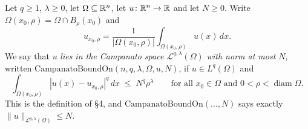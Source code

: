 \begin{definition}
Let $q\ge1$, $\lambda\ge0$, let $\Omega\subseteq\mathbb{R}^n$, let $u\colon\mathbb{R}^n\to\mathbb{R}$
and let $N\ge0$.  Write $\Omega(x_0,\rho)=\Omega\cap B_\rho(x_0)$ and
\[
u_{x_0,\rho}=\frac{1}{|\Omega(x_0,\rho)|}\int_{\Omega(x_0,\rho)}u(x)\,dx .
\]
We say that $u$ \emph{lies in the Campanato space $\mathcal L^{q,\lambda}(\Omega)$
with norm at most $N$}, written
$\mathrm{CampanatoBoundOn}(n,q,\lambda,\Omega,u,N)$, if $u\in L^q(\Omega)$ and
\[
\int_{\Omega(x_0,\rho)}|u(x)-u_{x_0,\rho}|^q\,dx\;\le\;N^q\rho^{\lambda}
\qquad\text{for all }x_0\in\Omega\text{ and }0<\rho<\operatorname{diam}\Omega .
\]
This is the definition of \S4, and
$\mathrm{CampanatoBoundOn}(\dots,N)$ says exactly
$\|u\|_{\mathcal L^{q,\lambda}(\Omega)}\le N$.
\end{definition}
